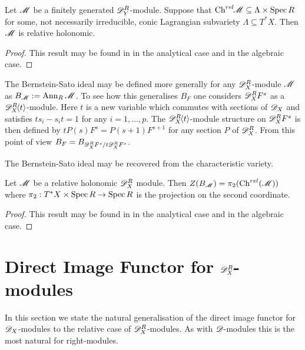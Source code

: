 \begin{lemma}\label{lem: InclusionCharVar}
  Let $\mathscr{M}$ be a finitely generated $\mathscr{D}_Y^R$-module. Suppose that $\operatorname{Ch}^{rel}\mkern-5mu \mathscr{M} \subseteq \Lambda \times \operatorname{Spec} R$ for some, not necessarily irreducible, conic Lagrangian subvariety $\Lambda\subseteq T^*X$. Then $\mathscr{M}$ is relative holonomic.
\end{lemma}
\begin{proof}
  This result may be found in \cite{maisonobe2016filtration} in the analytical case and \cite{budur2019zero} in the algebraic case.
\end{proof}
The Bernstein-Sato ideal may be defined more generally for any $\mathscr{D}_X^R$-module $\mathscr{M}$ as $B_{\mathscr{M}} := \operatorname{Ann}_{R}\mathscr{M}$. To see how this generalises $B_F$ one considers $\mathscr{D}_X^R F^s$ as a $\mathscr{D}_X^R\mkern-5mu\left\langle t \right\rangle$-module.
Here $t$ is a new variable which commutes with sections of $\mathscr{D}_X$ and satisfies $ts_i - s_it = 1$ for any $i=1,\ldots,
p$.  The $\mathscr{D}_X^R\mkern-5mu\left\langle t \right\rangle$-module structure on $\mathscr{D}_X^R F^s$ is then defined by $tP(s)F^s = P(s+1)F^{s + 1}$ for any section $P$ of $\mathscr{D}_X^R$. From this point of view $B_F = B_{\mathscr{D}_X^R F^s / t\mathscr{D}_X^R F^s}$.

The Bernstein-Sato ideal may be recovered from the characteristic variety.
\begin{proposition}\label{prop: ProjectionBernsteinSatoRelativeChar}
  Let $\mathscr{M}$ be a relative holonomic $\mathscr{D}_X^R$ module. Then  $Z(B_{\mathscr{M}}) = \pi_2(\operatorname{Ch}^{rel}(\mathscr{M}))$ where $\pi_2:T^*X\times \operatorname{Spec} R \to \operatorname{Spec} R$ is the projection on the second coordinate.
\end{proposition}
\begin{proof}
  This result may be found in \cite{maisonobe2016filtration} in the analytical case and \cite{budur2019zero} in the algebraic case.
\end{proof}
\section{Direct Image Functor for $\mathscr{D}_X^R$-modules}
    In this section we state the natural generalisation of the direct image functor for $\mathscr{D}_X$-modules to the relative case of $\mathscr{D}_X^R$-modules. As with $\mathscr{D}$-modules this is the most natural for right-modules.

